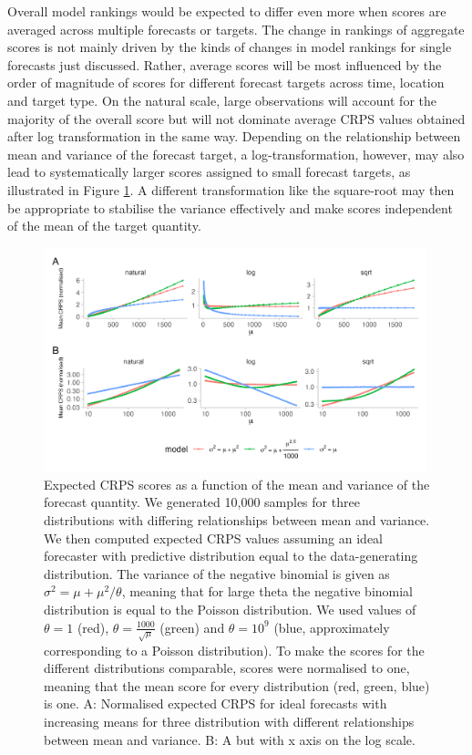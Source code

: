 \documentclass{article}
\begin{document}
Overall model rankings would be expected to differ even more when scores are averaged across multiple forecasts or targets. The change in rankings of aggregate scores is not mainly driven by the kinds of changes in model rankings for single forecasts just discussed. Rather, average scores will be most influenced by the order of magnitude of scores for different forecast targets across time, location and target type. On the natural scale, large observations will account for the majority of the overall score but will not dominate average CRPS values obtained after log transformation in the same way. Depending on the relationship between mean and variance of the forecast target, a log-transformation, however, may also lead to systematically larger scores assigned to small forecast targets, as illustrated in Figure \ref{fig:SIM-wis-state-size-mean}. A different transformation like the square-root may then be appropriate to stabilise the variance effectively and make scores independent of the mean of the target quantity. 

\begin{figure}[h!]
    \centering
    \includegraphics[width=0.99\textwidth]{output/figures/SIM-mean-state-size.png}
    \caption{Expected CRPS scores as a function of the mean and variance of the forecast quantity. We generated 10,000 samples for three distributions with differing relationships between mean and variance. We then computed expected CRPS values assuming an ideal forecaster with predictive distribution equal to the data-generating distribution. The variance of the negative binomial is given as $\sigma^2 = \mu + \mu^2 / \theta$, meaning that for large theta the negative binomial distribution is equal to the Poisson distribution. We used values of $\theta = 1$ (red), $\theta = \frac{1000}{\sqrt{\mu}}$ (green) and $\theta = 10^9$ (blue, approximately corresponding to a Poisson distribution). To make the scores for the different distributions comparable, scores were normalised to one, meaning that the mean score for every distribution (red, green, blue) is one. 
    A: Normalised expected CRPS for ideal forecasts with increasing means for three distribution with different relationships between mean and variance. B: A but with x axis on the log scale.}
    \label{fig:SIM-wis-state-size-mean}
\end{figure}
\end{document}
